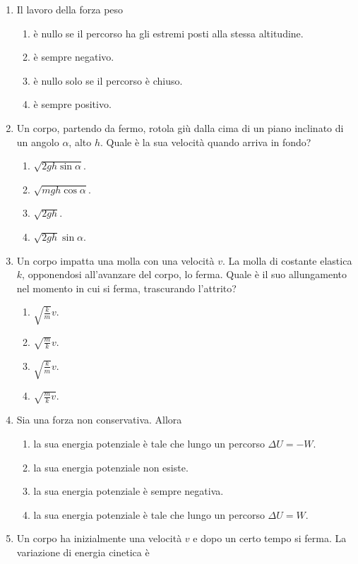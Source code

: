 \documentclass{article}
\begin{document}
\begin{enumerate}
  \item Il lavoro della forza peso
  \begin{enumerate}[label=\Alph*.]
    \item è nullo se il percorso ha gli estremi posti alla stessa altitudine.
    \item è sempre negativo.
    \item è nullo solo se il percorso è chiuso.
    \item è sempre positivo.
  \end{enumerate}
  \item Un corpo, partendo da fermo, rotola giù dalla cima di un piano inclinato di un angolo $\alpha$, alto $h$. Quale è la sua velocità quando arriva in fondo?
  \begin{enumerate}[label=\Alph*.]
    \item $\sqrt{2gh\sin\alpha}$.
    \item $\sqrt{mgh\cos\alpha}$.
    \item $\sqrt{2gh}$.
    \item $\sqrt{2gh}\sin\alpha$.
  \end{enumerate}
  \item Un corpo impatta una molla con una velocità $v$. La molla di costante elastica $k$, opponendosi all'avanzare del corpo, lo ferma. Quale è il suo allungamento nel momento in cui si ferma, trascurando l'attrito?
  \begin{enumerate}[label=\Alph*.]
    \item $\sqrt{\frac{k}{m}}v$.
    \item $\sqrt{\frac{m}{k}}v$.
    \item $\sqrt{\frac{k}{m}}v$.
    \item $\sqrt{\frac{m}{k}v}$.
  \end{enumerate}
  \item Sia  una forza non conservativa. Allora
  \begin{enumerate}[label=\Alph*.]
    \item la sua energia potenziale è tale che lungo un percorso $\Delta U=-W$.
    \item la sua energia potenziale non esiste.
    \item la sua energia potenziale è sempre negativa.
    \item la sua energia potenziale è tale che lungo un percorso $\Delta U=W$.
  \end{enumerate}
  \item Un corpo ha inizialmente una velocità $v$ e dopo un certo tempo si ferma. La variazione di energia cinetica è

\end{enumerate}
\end{document}
